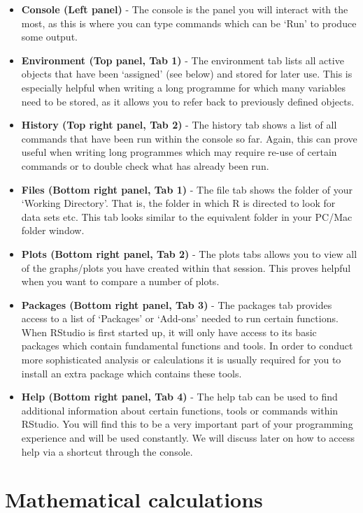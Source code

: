 \documentclass[
]{book}
\theoremstyle{definition}
\theoremstyle{definition}
\theoremstyle{definition}
\theoremstyle{definition}
\theoremstyle{remark}
\begin{document}
\begin{itemize}
\item
  \textbf{Console (Left panel)} - The console is the panel you will interact with the most, as this is where you can type commands which can be `Run' to produce some output.
\item
  \textbf{Environment (Top panel, Tab 1)} - The environment tab lists all active objects that have been `assigned' (see below) and stored for later use. This is especially helpful when writing a long programme for which many variables need to be stored, as it allows you to refer back to previously defined objects.
\item
  \textbf{History (Top right panel, Tab 2)} - The history tab shows a list of all commands that have been run within the console so far. Again, this can prove useful when writing long programmes which may require re-use of certain commands or to double check what has already been run.
\item
  \textbf{Files (Bottom right panel, Tab 1)} - The file tab shows the folder of your `Working Directory'. That is, the folder in which R is directed to look for data sets etc. This tab looks similar to the equivalent folder in your PC/Mac folder window.
\item
  \textbf{Plots (Bottom right panel, Tab 2)} - The plots tabs allows you to view all of the graphs/plots you have created within that session. This proves helpful when you want to compare a number of plots.
\item
  \textbf{Packages (Bottom right panel, Tab 3)} - The packages tab provides access to a list of `Packages' or `Add-ons' needed to run certain functions. When RStudio is first started up, it will only have access to its basic packages which contain fundamental functions and tools. In order to conduct more sophisticated analysis or calculations it is usually required for you to install an extra package which contains these tools.
\item
  \textbf{Help (Bottom right panel, Tab 4)} - The help tab can be used to find additional information about certain functions, tools or commands within RStudio. You will find this to be a very important part of your programming experience and will be used constantly. We will discuss later on how to access help via a shortcut through the console.
\end{itemize}

\hypertarget{mathematical-calculations}{%
\section{Mathematical calculations}\label{mathematical-calculations}}
\end{document}
